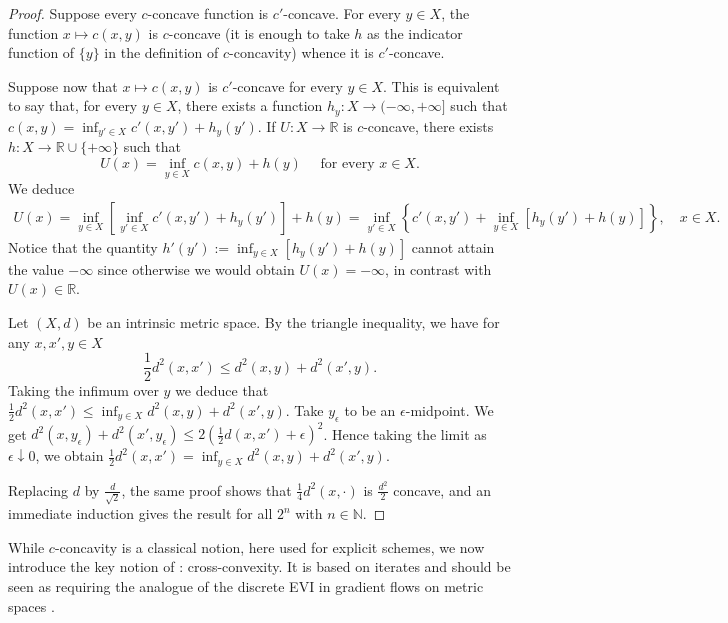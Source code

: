 \documentclass[reqno]{amsart}
\theoremstyle{plain}
\theoremstyle{remark}
\theoremstyle{plain}
\numberwithin{equation}{section}
\theoremstyle{remark}
\newcommand{\N}{\mathbb{N}}
\newcommand{\R}{\mathbb{R}}
\begin{document}
\begin{proof} Suppose every $c$-concave function is $c'$-concave. For every $y \in  X $, the function $x \mapsto c(x,y)$ is $c$-concave (it is enough to take $h$ as the indicator function of $\{y\}$ in the definition of $c$-concavity) whence it is $c'$-concave.

Suppose now that $x \mapsto c(x,y)$ is $c'$-concave for every $y \in  X $. This is equivalent to say that, for every $y \in  X $, there exists a function $h_y:  X  \to (-\infty, + \infty]$ such that $c(x,y) = \inf_{y' \in  X } c'(x,y')+ h_y(y')$. If $U:X \to \R$ is $c$-concave, there exists $h: X  \to \R\cup\{+ \infty\}$ such that 
\[  U(x)=\inf_{y\in  X }c(x,y)+h(y)\quad \text{ for every } x \in X.\]
We deduce
\begin{align*}
    U(x)= \inf_{y \in  X  } \left [ \inf_{y' \in  X } c'(x,y')+h_y(y') \right ] + h(y) =
    \inf_{y' \in  X } \left \{ c'(x,y')+ \inf_{y \in  X } \left [ h_y(y')+h(y) \right] \right \}, \quad x\in X.
\end{align*}
Notice that the quantity $h'(y'):= \inf_{y \in  X } \left [ h_y(y')+h(y) \right]$ cannot attain the value $-\infty$ since otherwise we would obtain $U(x)=-\infty$, in contrast with $U(x) \in \R$.

Let $(X,d)$ be an intrinsic metric space. By the triangle  inequality, we have for any $x,x',y\in X$
    \begin{equation*}
        \frac12 d^2(x,x') \le d^2(x,y)+d^2(x',y).
    \end{equation*}
    Taking the infimum over $y$ we deduce that $\frac12 d^2(x,x') \le \inf_{y\in X}d^2(x,y)+d^2(x',y)$.  Take  $y_\epsilon$ to be an $\epsilon$-midpoint. We get $d^2(x,y_\epsilon)+d^2(x',y_\epsilon) \le 2(\frac12 d(x,x')+\epsilon)^2$. Hence taking the limit  as  $\epsilon\downarrow 0$, we obtain $\frac12 d^2(x,x')= \inf_{y\in X}d^2(x,y)+d^2(x',y)$.

 Replacing $d$ by $\frac{d}{\sqrt{2}}$, the same proof shows that $\frac14 d^2(x,\cdot)$ is $\frac{d^2}{2}$ concave, and an immediate induction gives the result for all $2^n$ with $n\in\N$. 
\end{proof}

While $c$-concavity is a classical notion, here used for explicit schemes, we now introduce the key notion of \cite{leger2023gradient}: cross-convexity. It is based on iterates and should be seen as requiring the analogue of the discrete EVI in gradient flows on metric spaces \cite[Corollary 4.1.3]{ags08}.
\end{document}
